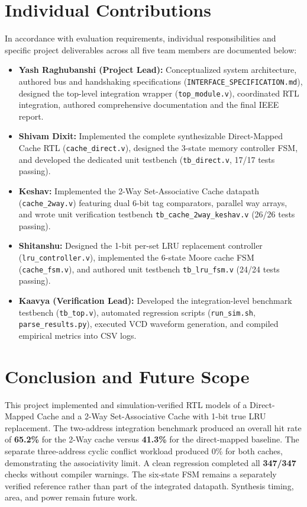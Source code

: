 \documentclass[10pt,twocolumn]{article}
\begin{document}
\section{Individual Contributions}
In accordance with evaluation requirements, individual responsibilities and specific project deliverables across all five team members are documented below:
\begin{itemize}
    \item \textbf{Yash Raghubanshi (Project Lead):} Conceptualized system architecture, authored bus and handshaking specifications (\texttt{INTERFACE\_SPECIFICATION.md}), designed the top-level integration wrapper (\texttt{top\_module.v}), coordinated RTL integration, authored comprehensive documentation and the final IEEE report.
    \item \textbf{Shivam Dixit:} Implemented the complete synthesizable Direct-Mapped Cache RTL (\texttt{cache\_direct.v}), designed the 3-state memory controller FSM, and developed the dedicated unit testbench (\texttt{tb\_direct.v}, 17/17 tests passing).
    \item \textbf{Keshav:} Implemented the 2-Way Set-Associative Cache datapath (\texttt{cache\_2way.v}) featuring dual 6-bit tag comparators, parallel way arrays, and wrote unit verification testbench \texttt{tb\_cache\_2way\_keshav.v} (26/26 tests passing).
    \item \textbf{Shitanshu:} Designed the 1-bit per-set LRU replacement controller (\texttt{lru\_controller.v}), implemented the 6-state Moore cache FSM (\texttt{cache\_fsm.v}), and authored unit testbench \texttt{tb\_lru\_fsm.v} (24/24 tests passing).
    \item \textbf{Kaavya (Verification Lead):} Developed the integration-level benchmark testbench (\texttt{tb\_top.v}), automated regression scripts (\texttt{run\_sim.sh}, \texttt{parse\_results.py}), executed VCD waveform generation, and compiled empirical metrics into CSV logs.
\end{itemize}

\section{Conclusion and Future Scope}
This project implemented and simulation-verified RTL models of a Direct-Mapped Cache and a 2-Way Set-Associative Cache with 1-bit true LRU replacement. The two-address integration benchmark produced an overall hit rate of \textbf{65.2\%} for the 2-Way cache versus \textbf{41.3\%} for the direct-mapped baseline. The separate three-address cyclic conflict workload produced 0\% for both caches, demonstrating the associativity limit. A clean regression completed all \textbf{347/347} checks without compiler warnings. The six-state FSM remains a separately verified reference rather than part of the integrated datapath. Synthesis timing, area, and power remain future work.
\end{document}
